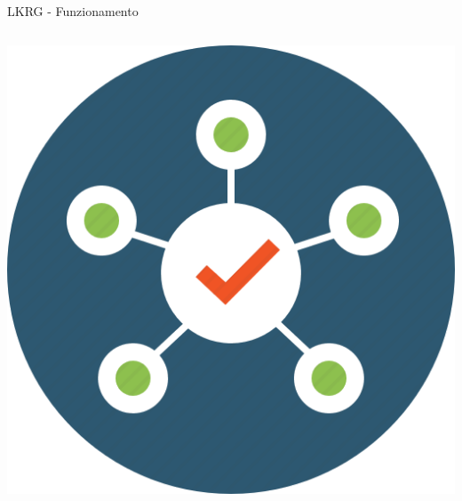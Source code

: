 \documentclass[12pt]{beamer}
\begin{document}
\begin{frame}[fragile]{LKRG - Funzionamento}
\begin{columns}
\begin{column}{0.5\textwidth}
{    				\includegraphics[scale=0.2]{res/Routine}
    			}
    		\end{column}
    	\end{columns}
  \end{frame}
\end{document}
